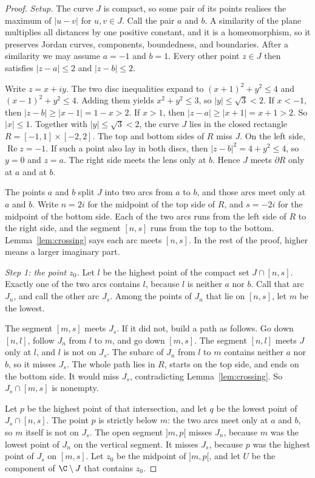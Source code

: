 \begin{proof}
\emph{Setup.} The curve $J$ is compact, so some pair of its points realises the maximum of $|u-v|$ for $u,v\in J$. Call the pair $a$ and $b$. A similarity of the plane multiplies all distances by one positive constant, and it is a homeomorphism, so it preserves Jordan curves, components, boundedness, and boundaries. After a similarity we may assume $a=-1$ and $b=1$. Every other point $z\in J$ then satisfies $|z-a|\le2$ and $|z-b|\le2$.

Write $z=x+iy$. The two disc inequalities expand to $(x+1)^2+y^2\le4$ and $(x-1)^2+y^2\le4$. Adding them yields $x^2+y^2\le3$, so $|y|\le\sqrt3<2$. If $x<-1$, then $|z-b|\ge|x-1|=1-x>2$. If $x>1$, then $|z-a|\ge|x+1|=x+1>2$. So $|x|\le1$. Together with $|y|\le\sqrt3<2$, the curve $J$ lies in the closed rectangle $R=[-1,1]\times[-2,2]$. The top and bottom sides of $R$ miss $J$. On the left side, $\operatorname{Re} z=-1$. If such a point also lay in both discs, then $|z-b|^2=4+y^2\le4$, so $y=0$ and $z=a$. The right side meets the lens only at $b$. Hence $J$ meets $\partial R$ only at $a$ and at $b$.

The points $a$ and $b$ split $J$ into two arcs from $a$ to $b$, and those arcs meet only at $a$ and $b$. Write $n=2i$ for the midpoint of the top side of $R$, and $s=-2i$ for the midpoint of the bottom side. Each of the two arcs runs from the left side of $R$ to the right side, and the segment $[n,s]$ runs from the top to the bottom. Lemma~\ref{lem:crossing} says each arc meets $[n,s]$. In the rest of the proof, higher means a larger imaginary part.

\emph{Step 1: the point $z_0$.} Let $l$ be the highest point of the compact set $J\cap[n,s]$. Exactly one of the two arcs contains $l$, because $l$ is neither $a$ nor $b$. Call that arc $J_n$, and call the other arc $J_s$. Among the points of $J_n$ that lie on $[n,s]$, let $m$ be the lowest.

The segment $[m,s]$ meets $J_s$. If it did not, build a path as follows. Go down $[n,l]$, follow $J_n$ from $l$ to $m$, and go down $[m,s]$. The segment $[n,l]$ meets $J$ only at $l$, and $l$ is not on $J_s$. The subarc of $J_n$ from $l$ to $m$ contains neither $a$ nor $b$, so it misses $J_s$. The whole path lies in $R$, starts on the top side, and ends on the bottom side. It would miss $J_s$, contradicting Lemma~\ref{lem:crossing}. So $J_s\cap[m,s]$ is nonempty.

Let $p$ be the highest point of that intersection, and let $q$ be the lowest point of $J_s\cap[n,s]$. The point $p$ is strictly below $m$: the two arcs meet only at $a$ and $b$, so $m$ itself is not on $J_s$. The open segment $]m,p[$ misses $J_n$, because $m$ was the lowest point of $J_n$ on the vertical segment. It misses $J_s$, because $p$ was the highest point of $J_s$ on $[m,s]$. Let $z_0$ be the midpoint of $]m,p[$, and let $U$ be the component of $\C\setminus J$ that contains $z_0$.


\end{proof}
